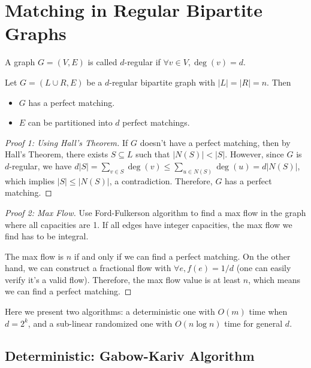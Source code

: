 \chapter{Matching in Regular Bipartite Graphs}

\begin{definition}
	A graph \( G = (V, E) \) is called \( d \)-regular if $\forall v \in V, \deg(v) = d$.
\end{definition}

\begin{theorem}
	\label{thm:regular-matching}
	Let \( G = (L \cup R, E) \) be a \( d \)-regular bipartite graph with \( |L| = |R| = n \). Then
	\begin{itemize}
		\item \( G \) has a perfect matching.
		\item $E$ can be partitioned into $d$ perfect matchings.
	\end{itemize}
\end{theorem}
\begin{proof}[Proof 1: Using Hall's Theorem]
	If $G$ doesn't have a perfect matching, then by Hall's Theorem, there exists $S \subseteq L$ such that $|N(S)| < |S|$. However, since $G$ is $d$-regular, we have $d|S| = \sum_{v \in S} \deg(v) \le \sum_{u \in N(S)} \deg(u) = d|N(S)|$, which implies $|S| \le |N(S)|$, a contradiction. Therefore, $G$ has a perfect matching.
\end{proof}
\begin{proof}[Proof 2: Max Flow]
	Use Ford-Fulkerson algorithm to find a max flow in the graph where all capacities are 1.
	If all edges have integer capacities, the max flow we find has to be integral.

	The max flow is $n$ if and only if we can find a perfect matching.
	On the other hand, we can construct a fractional flow with $\forall e, f(e) = 1/d$ (one can easily verify it's a valid flow). Therefore, the max flow value is at least $n$, which means we can find a perfect matching.
\end{proof}

Here we present two algorithms: a deterministic one with $O(m)$ time when $d = 2^k$, and a sub-linear randomized one with $O(n \log n)$ time for general $d$.

\section{Deterministic: Gabow-Kariv Algorithm}


